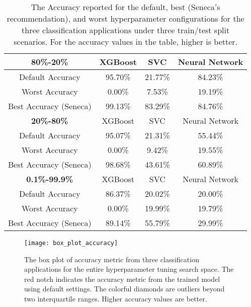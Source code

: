 \begin{table}
\centering
\begin{tabular}{|c|c|c|c|}
\hline
\textbf{80\%-20\%} & XGBoost & SVC & Neural Network\\
\hline
\hline
Default Accuracy & 95.70\% & 21.77\% & 84.23\%\\
\hline
Worst Accuracy&0.00\%&7.53\% & 19.19\%\\
\hline
Best Accuracy (Seneca) &99.13\% & 83.29\% & 84.76\%\\
\hline
\hline
\textbf{20\%-80\%} & XGBoost & SVC & Neural Network\\
\hline
Default Accuracy & 95.07\% & 21.31\% & 55.44\%\\
\hline
Worst Accuracy&0.00\% & 9.42\% & 19.55\%\\
\hline
Best Accuracy (Seneca) & 98.68\% & 43.61\% & 60.89\%\\
\hline
\hline
\textbf{0.1\%-99.9\%} & XGBoost & SVC & Neural Network\\
\hline
Default Accuracy & 86.37\% & 20.02\% & 20.00\%\\
\hline
Worst Accuracy & 0.00\% & 19.99\% & 19.79\%\\
\hline
Best Accuracy (Seneca) & 89.14\% & 55.79\% & 29.99\%\\
\hline

\end{tabular}
\caption{The Accuracy reported for the 
default, best (Seneca's recommendation), and worst hyperparameter configurations for 
the three classification applications under three train/test split scenarios.  
For the accuracy values in the table, higher is better.
\label{tab:accuracy}}
\end{table}

\begin{figure}[t] \centering 
\texttt{[image: box\_plot\_accuracy]}
\caption{The box plot of accuracy metric from three classification applications for the entire hyperparameter tuning search space. The red notch indicates the accuracy metric from the trained model using default settings. The colorful diamonds are outliers beyond two interquartile ranges. Higher accuracy values are better.
\label{fig:box_plot_accuracy}}
\end{figure}

